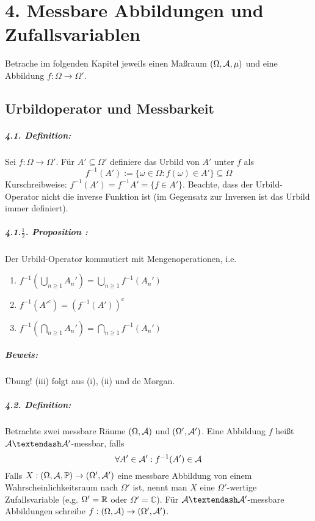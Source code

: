 \chapter*{4. Messbare Abbildungen und Zufallsvariablen}

Betrache im folgenden Kapitel jeweils einen Ma\ss{}raum $(\Omega,\mathcal{A},\mu)$ und eine Abbildung $f:\Omega\to\Omega'$.

 \section*{Urbildoperator und Messbarkeit}
\paragraph{4.1. Definition:}Sei $f:\Omega\to\Omega'$. F\"ur $A'\subseteq\Omega'$ definiere das Urbild von $A'$ unter $f$ als
$$f^{-1}(A'):=\{\omega\in\Omega:f(\omega)\in A'\}\subseteq\Omega$$
Kurschreibweise: $f^{-1}(A')=f^{-1}A'=\{f\in A'\}$. Beachte, dass der Urbild-Operator nicht die inverse Funktion ist (im Gegensatz zur Inversen ist das Urbild immer definiert).

\paragraph{4.1.$\frac{1}{2}$. Proposition :}Der Urbild-Operator kommutiert mit Mengenoperationen, i.e.
\begin{enumerate}[label=(\roman*)]
    \item $\displaystyle f^{-1}\left(\bigcup_{n\geq1}A_n'\right)=\bigcup_{n\geq1}f^{-1}(A_n')$
    \item $\displaystyle f^{-1}(A'^c)=\left(f^{-1}(A')\right)^c$
    \item $\displaystyle f^{-1}\left(\bigcap_{n\geq1}A_n'\right)=\bigcap_{n\geq1}f^{-1}(A_n')$
\end{enumerate}

\paragraph{Beweis:} \"Ubung! (iii) folgt aus (i), (ii) und de Morgan.

\paragraph{4.2. Definition:}Betrachte zwei messbare R\"aume $(\Omega,\mathcal{A})$ und $(\Omega',\mathcal{A}')$. Eine Abbildung $f$ hei\ss{}t $\A\textendash\A'$-messbar, falls 
$$\forall A'\in\mathcal{A}':f^{-1}(A')\in\mathcal{A}$$
Falls $X:(\Omega, \mathcal{A}, \mathbb{P})\to(\Omega',\mathcal{A}')$ eine messbare Abbildung von einem Wahrscheinlichkeitsraum nach $\Omega'$ ist, nennt man $X$ eine $\Omega'$-wertige Zufallsvariable (e.g. $\Omega'=\mathbb{R}$ oder $\Omega'=\mathbb{C}$). F\"ur $\A\textendash\A'$-messbare Abbildungen schreibe $f:(\Omega,\mathcal{A})\to(\Omega',\mathcal{A}')$.

